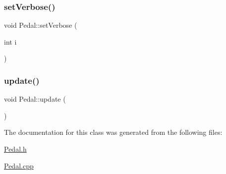 \subsubsection{\texorpdfstring{set\+Verbose()}{setVerbose()}}
{\footnotesize\ttfamily void Pedal\+::set\+Verbose (\begin{DoxyParamCaption}\item[{int}]{i }\end{DoxyParamCaption})}

\mbox{\label{class_pedal_aa696e50f79dc3723a9b434f9895a8e81}} 
\subsubsection{\texorpdfstring{update()}{update()}}
{\footnotesize\ttfamily void Pedal\+::update (\begin{DoxyParamCaption}{ }\end{DoxyParamCaption})}



The documentation for this class was generated from the following files\+:\begin{DoxyCompactItemize}
\item 
\mbox{\hyperlink{_pedal_8h}{Pedal.\+h}}\item 
\mbox{\hyperlink{_pedal_8cpp}{Pedal.\+cpp}}\end{DoxyCompactItemize}
